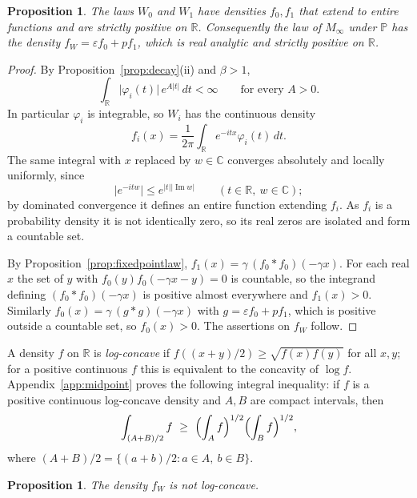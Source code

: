 \documentclass{amsart}
\newtheorem{proposition}[theorem]{Proposition}
\theoremstyle{definition}
\theoremstyle{remark}
\numberwithin{equation}{section}
\newcommand{\eps}{\varepsilon}
\newcommand{\Prob}{\mathbb{P}}
\newcommand{\R}{\mathbb{R}}
\newcommand{\C}{\mathbb{C}}
\newcommand{\abs}[1]{\lvert #1\rvert}
\begin{document}
\begin{proposition}\label{prop:analytic}
The laws $W_0$ and $W_1$ have densities $f_0,f_1$ that extend to entire functions and are strictly positive on $\R$. Consequently the law of $M_\infty$ under $\Prob$ has the density $f_W=\eps f_0+pf_1$, which is real analytic and strictly positive on $\R$.
\end{proposition}

\begin{proof}
By Proposition~\ref{prop:decay}(ii) and $\beta>1$,
\[
\int_\R\abs{\varphi_i(t)}\,e^{A\abs t}\,dt<\infty\qquad\text{for every }A>0 .
\]
In particular $\varphi_i$ is integrable, so $W_i$ has the continuous density
\[
f_i(x)=\frac1{2\pi}\int_\R e^{-itx}\varphi_i(t)\,dt .
\]
The same integral with $x$ replaced by $w\in\C$ converges absolutely and locally uniformly, since
\[
\abs{e^{-itw}}\le e^{\abs t\abs{\operatorname{Im}w}}\qquad(t\in\R,\ w\in\C);
\]
by dominated convergence it defines an entire function extending $f_i$. As $f_i$ is a probability density it is not identically zero, so its real zeros are isolated and form a countable set.

By Proposition~\ref{prop:fixedpointlaw}, $f_1(x)=\gamma\,(f_0*f_0)(-\gamma x)$. For each real $x$ the set of $y$ with $f_0(y)f_0(-\gamma x-y)=0$ is countable, so the integrand defining $(f_0*f_0)(-\gamma x)$ is positive almost everywhere and $f_1(x)>0$. Similarly $f_0(x)=\gamma\,(g*g)(-\gamma x)$ with $g=\eps f_0+pf_1$, which is positive outside a countable set, so $f_0(x)>0$. The assertions on $f_W$ follow.
\end{proof}

A density $f$ on $\R$ is \emph{log-concave} if $f((x+y)/2)\ge\sqrt{f(x)f(y)}$ for all $x,y$; for a positive continuous $f$ this is equivalent to the concavity of $\log f$. Appendix~\ref{app:midpoint} proves the following integral inequality: if $f$ is a positive continuous log-concave density and $A,B$ are compact intervals, then
\begin{equation}\label{eq:midpoint}
\int_{(A+B)/2}f\ \ge\ \Bigl(\int_Af\Bigr)^{1/2}\Bigl(\int_Bf\Bigr)^{1/2},
\end{equation}
where $(A+B)/2=\{(a+b)/2:a\in A,\ b\in B\}$.

\begin{proposition}\label{prop:notlc}
The density $f_W$ is not log-concave.
\end{proposition}
\end{document}
